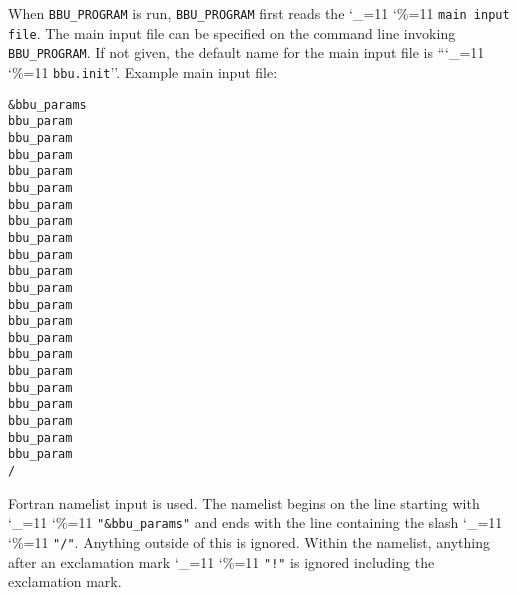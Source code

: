 \documentclass[11pt]{article}
\newcommand{\bbup}{\texttt{BBU_PROGRAM}\xspace}
\newcommand\ttcmd{\begingroup\catcode`\_=11 \catcode`\%=11 \dottcmd}
\newcommand\dottcmd[1]{\texttt{#1}\endgroup}
\newcommand{\vn}{\ttcmd}
\newlength{\ExBeg}
\newlength{\ExEnd}
\newenvironment{example}
  {\vspace{\ExBeg} \begin{alltt}}
  {\end{alltt} \vspace{\ExEnd}}
\begin{document}
When \bbup is run, \bbup first reads the \vn{main input file}.
The main input file can be specified on the command line invoking {\bbup}.
If not given, the default name for the main input file is ``\vn{bbu.init}''.
Example main input file:
\begin{example}
&bbu_params
  bbu_param%
  bbu_param%
  bbu_param%
  bbu_param%
  bbu_param%
  bbu_param%
  bbu_param%
  bbu_param%
  bbu_param%
  bbu_param%
  bbu_param%
  bbu_param%
  bbu_param%
  bbu_param%
  bbu_param%
  bbu_param%
  bbu_param%
  bbu_param%
  bbu_param%
  bbu_param%
  bbu_param%
/
\end{example}
Fortran namelist input is used.
The namelist begins on the line starting with \vn{"\&bbu_params"}
and ends with the line containing the slash \vn{"/"}. Anything outside
of this is ignored. Within the namelist, anything after an exclamation
mark \vn{"!"} is ignored including the exclamation mark. 
\end{document}
